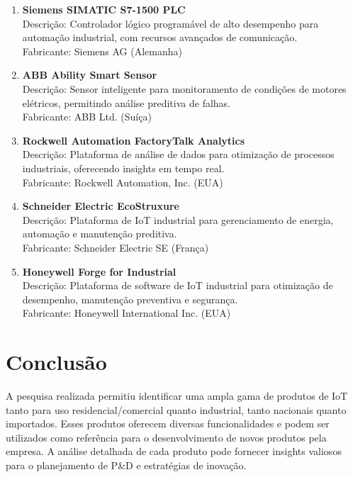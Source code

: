 \documentclass{estacio}
\begin{document}
\begin{enumerate}
    \item \textbf{Siemens SIMATIC S7-1500 PLC}\\
    Descrição: Controlador lógico programável de alto desempenho para automação industrial, com recursos avançados de comunicação.\\
    Fabricante: Siemens AG (Alemanha)

    \item \textbf{ABB Ability Smart Sensor}\\
    Descrição: Sensor inteligente para monitoramento de condições de motores elétricos, permitindo análise preditiva de falhas.\\
    Fabricante: ABB Ltd. (Suíça)

    \item \textbf{Rockwell Automation FactoryTalk Analytics}\\
    Descrição: Plataforma de análise de dados para otimização de processos industriais, oferecendo insights em tempo real.\\
    Fabricante: Rockwell Automation, Inc. (EUA)

    \item \textbf{Schneider Electric EcoStruxure}\\
    Descrição: Plataforma de IoT industrial para gerenciamento de energia, automação e manutenção preditiva.\\
    Fabricante: Schneider Electric SE (França)

    \item \textbf{Honeywell Forge for Industrial}\\
    Descrição: Plataforma de software de IoT industrial para otimização de desempenho, manutenção preventiva e segurança.\\
    Fabricante: Honeywell International Inc. (EUA)
\end{enumerate}

\section{Conclusão}
A pesquisa realizada permitiu identificar uma ampla gama de produtos de IoT tanto para uso residencial/comercial quanto industrial, tanto nacionais quanto importados. Esses produtos oferecem diversas funcionalidades e podem ser utilizados como referência para o desenvolvimento de novos produtos pela empresa. A análise detalhada de cada produto pode fornecer insights valiosos para o planejamento de P\&D e estratégias de inovação.
\end{document}
